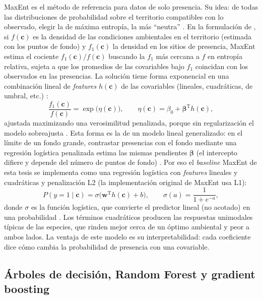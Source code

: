 MaxEnt es el método de referencia para datos de solo presencia. Su idea: de
todas las distribuciones de probabilidad sobre el territorio compatibles con
lo observado, elegir la de máxima entropía, la más ``neutra''
\citep[p.~217]{guisan2017hsdm}. En la formulación de
\citet{elith2011maxent}, si $f(\mathbf{c})$ es la densidad de las condiciones
ambientales en el territorio (estimada con los puntos de fondo) y
$f_1(\mathbf{c})$ la densidad en los sitios de presencia, MaxEnt estima el
cociente $f_1(\mathbf{c})/f(\mathbf{c})$ buscando la $f_1$ más cercana a $f$ en
entropía relativa, sujeta a que los promedios de las covariables bajo $f_1$
coincidan con los observados en las presencias. La solución tiene forma
exponencial en una
combinación lineal de \emph{features} $h(\mathbf{c})$ de las covariables
(lineales, cuadráticas, de umbral, etc.) \citep{phillips2006maxent}:
\begin{equation}
  \frac{f_1(\mathbf{c})}{f(\mathbf{c})} = \exp\!\big(\eta(\mathbf{c})\big),
  \qquad \eta(\mathbf{c}) = \beta_0 + \boldsymbol{\beta}^{\mathrm{T}} h(\mathbf{c}),
  \label{eq:maxent}
\end{equation}
ajustada maximizando una verosimilitud penalizada, porque sin
regularización el modelo sobreajusta \citep[p.~219]{guisan2017hsdm}. Esta
forma es la de un modelo lineal generalizado: en el límite de un fondo
grande, contrastar presencias con el fondo mediante una regresión logística
penalizada estima las mismas pendientes $\boldsymbol{\beta}$ (el intercepto
difiere y depende del número de puntos de fondo)
\citep{fithian2013equivalence}. Por eso el \textit{baseline} MaxEnt de esta
tesis se implementa como una regresión logística con \textit{features}
lineales y cuadráticas y penalización L2 (la implementación original de
MaxEnt usa L1):
\begin{equation}
  P(y = 1 \mid \mathbf{c}) = \sigma\!\big(\mathbf{w}^{\mathrm{T}} h(\mathbf{c}) + b\big),
  \qquad \sigma(a) = \frac{1}{1 + e^{-a}},
  \label{eq:logistica}
\end{equation}
donde $\sigma$ es la función logística, que convierte el predictor lineal
(no acotado) en una probabilidad \citep[pp.~165--167]{guisan2017hsdm}. Los
términos cuadráticos producen las respuestas unimodales típicas de las
especies, que rinden mejor cerca de un óptimo ambiental y peor a ambos
lados. La ventaja de este modelo es su
interpretabilidad: cada coeficiente dice cómo cambia la probabilidad de
presencia con una covariable.

\subsection{Árboles de decisión, Random Forest y gradient boosting}

